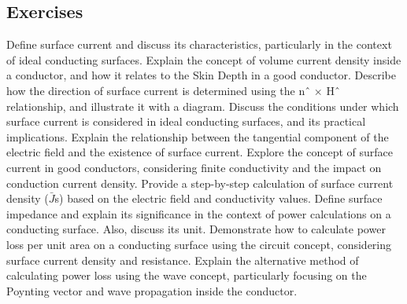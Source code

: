 \begin{mdframed}[backgroundcolor=lightblue, linewidth=1pt,  hidealllines=true]
\section{Exercises}
\begin{ExerciseList}
	\Exercise[label={ex11}] Define surface current and discuss its characteristics, particularly in the context of ideal conducting surfaces.
	\Exercise[label={ex11}] Explain the concept of volume current density inside a conductor, and how it relates to the Skin Depth in a good conductor.
	\Exercise[label={ex11}] Describe how the direction of surface current is determined using the nˆ × Hˆ relationship, and illustrate it with a diagram.
	\Exercise[label={ex11}] Discuss the conditions under which surface current is considered in ideal conducting surfaces, and its practical implications.
	\Exercise[label={ex11}] Explain the relationship between the tangential component of the electric field and the existence of surface current.
	\Exercise[label={ex11}] Explore the concept of surface current in good conductors, considering finite conductivity and the impact on conduction current density.
	\Exercise[label={ex11}] Provide a step-by-step calculation of surface current density ($\bar{J}$s) based on the electric field and conductivity values.
	\Exercise[label={ex11}] Define surface impedance and explain its significance in the context of power calculations on a conducting surface. Also, discuss its unit.
	\Exercise[label={ex11}] Demonstrate how to calculate power loss per unit area on a conducting surface using the circuit concept, considering surface current density and resistance.
	\Exercise[label={ex11}] Explain the alternative method of calculating power loss using the wave concept, particularly focusing on the Poynting vector and wave propagation inside the conductor.
\end{ExerciseList}
\end{mdframed}